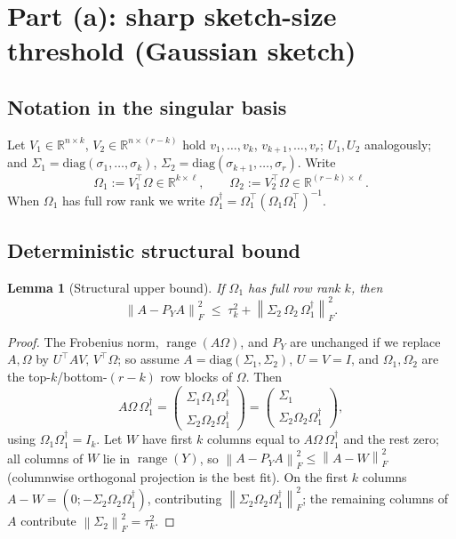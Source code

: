 \documentclass{amsart}
\newtheorem{lemma}{Lemma}
\theoremstyle{definition}
\DeclareMathOperator{\range}{range}
\newcommand{\R}{\mathbb{R}}
\newcommand{\Frob}[1]{\left\lVert #1\right\rVert_F}
\begin{document}
\section{Part (a): sharp sketch-size threshold (Gaussian sketch)}

\subsection{Notation in the singular basis}
Let $V_1\in\R^{n\times k}$, $V_2\in\R^{n\times(r-k)}$ hold $v_1,\dots,v_k$,
$v_{k+1},\dots,v_r$; $U_1,U_2$ analogously; and
$\Sigma_1=\mathrm{diag}(\sigma_1,\dots,\sigma_k)$,
$\Sigma_2=\mathrm{diag}(\sigma_{k+1},\dots,\sigma_r)$. Write
\begin{equation}\label{eq:OmBlocks}
\Omega_1:=V_1^\top\Omega\in\R^{k\times\ell},\qquad
\Omega_2:=V_2^\top\Omega\in\R^{(r-k)\times\ell}.
\end{equation}
When $\Omega_1$ has full row rank we write
$\Omega_1^{\dagger}=\Omega_1^\top(\Omega_1\Omega_1^\top)^{-1}$.

\subsection{Deterministic structural bound}

\begin{lemma}[Structural upper bound]\label{lem:struct}
If $\Omega_1$ has full row rank $k$, then
\begin{equation}\label{eq:structbound}
\Frob{A-P_Y A}^2 \;\le\; \tau_k^2+\Frob{\Sigma_2\,\Omega_2\,\Omega_1^{\dagger}}^2 .
\end{equation}
\end{lemma}

\begin{proof}
The Frobenius norm, $\range(A\Omega)$, and $P_Y$ are unchanged if we replace
$A,\Omega$ by $U^\top AV,\,V^\top\Omega$; so assume
$A=\mathrm{diag}(\Sigma_1,\Sigma_2)$, $U=V=I$, and $\Omega_1,\Omega_2$ are the
top-$k$/bottom-$(r-k)$ row blocks of $\Omega$. Then
\[
A\Omega\,\Omega_1^{\dagger}
=\begin{pmatrix}\Sigma_1\Omega_1\Omega_1^{\dagger}\\
\Sigma_2\Omega_2\Omega_1^{\dagger}\end{pmatrix}
=\begin{pmatrix}\Sigma_1\\ \Sigma_2\Omega_2\Omega_1^{\dagger}\end{pmatrix},
\]
using $\Omega_1\Omega_1^{\dagger}=I_k$. Let $W$ have first $k$ columns equal to
$A\Omega\,\Omega_1^{\dagger}$ and the rest zero; all columns of $W$ lie in
$\range(Y)$, so $\Frob{A-P_YA}^2\le\Frob{A-W}^2$ (columnwise orthogonal
projection is the best fit). On the first $k$ columns
$A-W=(0;-\Sigma_2\Omega_2\Omega_1^{\dagger})$, contributing
$\Frob{\Sigma_2\Omega_2\Omega_1^{\dagger}}^2$; the remaining columns of $A$
contribute $\Frob{\Sigma_2}^2=\tau_k^2$.
\end{proof}
\end{document}

